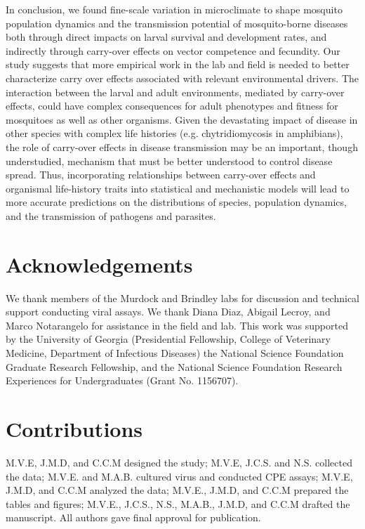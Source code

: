 \documentclass[12pt]{article}
\begin{document}
In conclusion, we found fine-scale variation in microclimate to shape mosquito population dynamics and the transmission potential of mosquito-borne diseases both through direct impacts on larval survival and development rates, and indirectly through carry-over effects on vector competence and fecundity. Our study suggests that more empirical work in the lab and field is needed to better characterize carry over effects associated with relevant environmental drivers. The interaction between the larval and adult environments, mediated by carry-over effects, could have complex consequences for adult phenotypes and fitness for mosquitoes as well as other organisms. Given the devastating impact of disease in other species with complex life histories (e.g. chytridiomycosis in amphibians), the role of carry-over effects in disease transmission may be an important, though understudied, mechanism that must be better understood to control disease spread. Thus, incorporating relationships between carry-over effects and organismal life-history traits into statistical and mechanistic models will lead to more accurate predictions on the distributions of species, population dynamics, and the transmission of pathogens and parasites. 

\section{Acknowledgements}
We thank members of the Murdock and Brindley labs for discussion and technical support conducting viral assays. We thank Diana Diaz, Abigail Lecroy, and Marco Notarangelo for assistance in the field and lab. This work was supported by the University of Georgia (Presidential Fellowship, College of Veterinary Medicine, Department of Infectious Diseases) the National Science Foundation Graduate Research Fellowship, and the National Science Foundation Research Experiences for Undergraduates (Grant No. 1156707). 

\section{Contributions}
M.V.E, J.M.D, and C.C.M designed the study; M.V.E, J.C.S. and N.S. collected the data; M.V.E. and M.A.B. cultured virus and conducted CPE assays; M.V.E, J.M.D, and C.C.M analyzed the data; M.V.E., J.M.D, and C.C.M prepared the tables and figures; M.V.E., J.C.S., N.S., M.A.B., J.M.D, and C.C.M drafted the manuscript. All authors gave final approval for publication.
\end{document}
